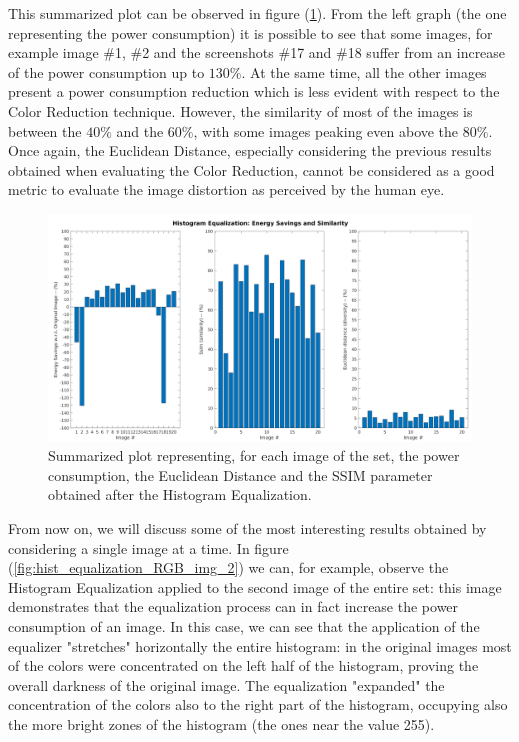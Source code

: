 \documentclass[a4paper]{article}
\begin{document}
            This summarized plot can be observed in figure (\ref{fig:HistEqOverall}).
            From the left graph (the one representing the power consumption) it is possible to see that some images, for example image \#1, \#2 and the screenshots \#17 and \#18 suffer from an increase of the power consumption up to $130\%$. At the same time, all the other images present a power consumption reduction which is less evident with respect to the Color Reduction technique. However, the similarity of most of the images is between the $40\%$ and the $60\%$, with some images peaking even above the $80\%$. Once again, the Euclidean Distance, especially considering the previous results obtained when evaluating the Color Reduction, cannot be considered as a good metric to evaluate the image distortion as perceived by the human eye.

            \begin{figure}[htp]
                \centering
                \includegraphics[width=0.8 \columnwidth]{./screenshots/HistEqOverall}
                \caption{
                        \label{fig:HistEqOverall}
                        Summarized plot representing, for each image of the set, the power consumption, the Euclidean Distance and the SSIM parameter obtained after the Histogram Equalization.
                }
            \end{figure}

            From now on, we will discuss some of the most interesting results obtained by considering a single image at a time.
            In figure (\ref{fig:hist_equalization_RGB_img_2}) we can, for example, observe the Histogram Equalization applied to the second image of the entire set: this image demonstrates that the equalization process can in fact increase the power consumption of an image. In this case, we can see that the application of the equalizer "stretches" horizontally the entire histogram: in the original images most of the colors were concentrated on the left half of the histogram, proving the overall darkness of the original image. The equalization "expanded" the concentration of the colors also to the right part of the histogram, occupying also the more bright zones of the histogram (the ones near the value 255).
\end{document}
